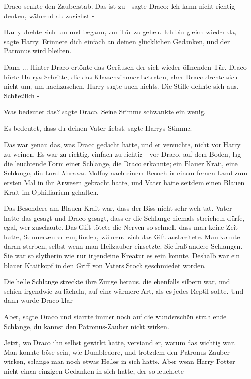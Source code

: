 Draco senkte den Zauberstab. \glqq{}Das ist zu -\grqq{} sagte Draco: \glqq{}Ich
kann nicht richtig denken, während du zusiehst -\grqq{}

Harry drehte sich um und begann, zur Tür zu gehen. \glqq{}Ich bin gleich wieder
da\grqq{}, sagte Harry. \glqq{}Erinnere dich einfach an deinen glücklichen
Gedanken, und der Patronus wird bleiben.\grqq{}

Dann ... Hinter Draco ertönte das Geräusch der sich wieder öffnenden Tür. Draco
hörte Harrys Schritte, die das Klassenzimmer betraten, aber Draco drehte sich
nicht um, um nachzusehen. Harry sagte auch nichts. Die Stille dehnte sich aus.
Schließlich -

\glqq{}Was bedeutet das?\grqq{} sagte Draco. Seine Stimme schwankte ein wenig.

\glqq{}Es bedeutet, dass du deinen Vater liebst\grqq{}, sagte Harrys Stimme.

Das war genau das, was Draco gedacht hatte, und er versuchte, nicht vor Harry zu
weinen. Es war zu richtig, einfach zu richtig - vor Draco, auf dem Boden, lag
die leuchtende Form einer Schlange, die Draco erkannte; ein Blauer Krait, eine
Schlange, die Lord Abraxas Malfoy nach einem Besuch in einem fernen Land zum
ersten Mal in ihr Anwesen gebracht hatte, und Vater hatte seitdem einen Blauen
Krait im Ophidiarium gehalten.

Das Besondere am Blauen Krait war, dass der Biss nicht sehr weh tat. Vater hatte
das gesagt und Draco gesagt, dass er die Schlange niemals streicheln dürfe,
egal, wer zuschaute. Das Gift tötete die Nerven so schnell, dass man keine Zeit
hatte, Schmerzen zu empfinden, während sich das Gift ausbreitete. Man konnte
daran sterben, selbst wenn man Heilzauber einsetzte. Sie fraß andere Schlangen.
Sie war so slytherin wie nur irgendeine Kreatur es sein konnte. Deshalb war ein
blauer Kraitkopf in den Griff von Vaters Stock geschmiedet worden.

Die helle Schlange streckte ihre Zunge heraus, die ebenfalls silbern war, und
schien irgendwie zu lächeln, auf eine wärmere Art, als es jedes Reptil sollte.
Und dann wurde Draco klar -

\glqq{}Aber\grqq{}, sagte Draco und starrte immer noch auf die wunderschön
strahlende Schlange, \glqq{}du kannst den Patronus-Zauber nicht wirken.\grqq{}

Jetzt, wo Draco ihn selbst gewirkt hatte, verstand er, warum das wichtig war.
Man konnte böse sein, wie Dumbledore, und trotzdem den Patronus-Zauber wirken,
solange man noch etwas Helles in sich hatte. Aber wenn Harry Potter nicht einen
einzigen Gedanken in sich hatte, der so leuchtete -

